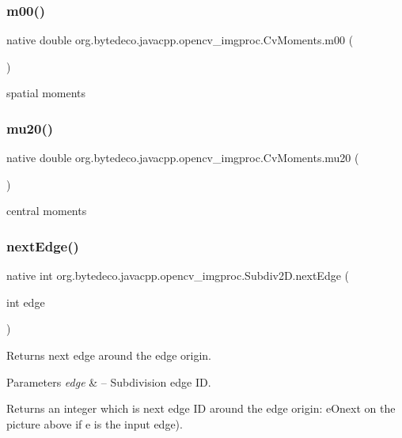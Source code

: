 \subsubsection{\texorpdfstring{m00()}{m00()}}
{\footnotesize\ttfamily native double org.\+bytedeco.\+javacpp.\+opencv\+\_\+imgproc.\+Cv\+Moments.\+m00 (\begin{DoxyParamCaption}{ }\end{DoxyParamCaption})}

spatial moments \mbox{\label{group__imgproc_ga0ad47b9e5cae2b42681f6614aab8adfc}} 
\subsubsection{\texorpdfstring{mu20()}{mu20()}}
{\footnotesize\ttfamily native double org.\+bytedeco.\+javacpp.\+opencv\+\_\+imgproc.\+Cv\+Moments.\+mu20 (\begin{DoxyParamCaption}{ }\end{DoxyParamCaption})}

central moments \mbox{\label{group__imgproc_ga38e3ebcc5d8682369388dd02acaa43a6}} 
\subsubsection{\texorpdfstring{next\+Edge()}{nextEdge()}}
{\footnotesize\ttfamily native int org.\+bytedeco.\+javacpp.\+opencv\+\_\+imgproc.\+Subdiv2\+D.\+next\+Edge (\begin{DoxyParamCaption}\item[{int}]{edge }\end{DoxyParamCaption})}



Returns next edge around the edge origin. 


\begin{DoxyParams}{Parameters}
{\em edge} & – Subdivision edge ID. \\
\hline
\end{DoxyParams}
\begin{DoxyReturn}{Returns}
an integer which is next edge ID around the edge origin\+: e\+Onext on the picture above if e is the input edge). 
\end{DoxyReturn}
\mbox{\label{group__imgproc_ga291c319aa2e16f48fced0c98b62516d3}} 
